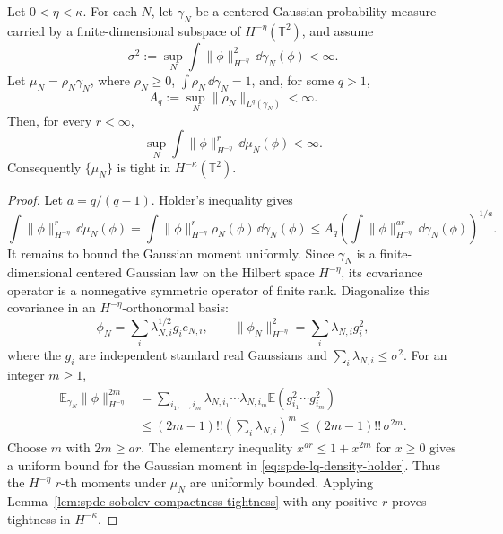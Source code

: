 \begin{lemma}
\label{lem:spde-lq-density-negative-sobolev-moment}
Let \(0<\eta<\kappa\).  For each \(N\), let \(\gamma_N\) be a centered
Gaussian probability measure carried by a finite-dimensional subspace of
\(H^{-\eta}(\mathbb T^2)\), and assume
\[
  \sigma^2:=
  \sup_N
  \int \|\phi\|_{H^{-\eta}}^2\,\dd\gamma_N(\phi)
  <\infty .
\]
Let \(\mu_N=\rho_N\gamma_N\), where
\(\rho_N\geq0\), \(\int\rho_N\,\dd\gamma_N=1\), and, for some \(q>1\),
\[
  A_q:=\sup_N\|\rho_N\|_{L^q(\gamma_N)}<\infty .
\]
Then, for every \(r<\infty\),
\[
  \sup_N
  \int\|\phi\|_{H^{-\eta}}^r\,\dd\mu_N(\phi)
  <\infty .
\]
Consequently \(\{\mu_N\}\) is tight in \(H^{-\kappa}(\mathbb T^2)\).
\end{lemma}

\begin{proof}
Let \(a=q/(q-1)\).  Holder's inequality gives
\begin{equation}
  \int\|\phi\|_{H^{-\eta}}^r\,\dd\mu_N(\phi)
  =
  \int\|\phi\|_{H^{-\eta}}^r\rho_N(\phi)\,\dd\gamma_N(\phi)
  \leq
  A_q
  \left(
    \int\|\phi\|_{H^{-\eta}}^{ar}\,\dd\gamma_N(\phi)
  \right)^{1/a}.
  \label{eq:spde-lq-density-holder}
\end{equation}
It remains to bound the Gaussian moment uniformly.  Since \(\gamma_N\) is a
finite-dimensional centered Gaussian law on the Hilbert space
\(H^{-\eta}\), its covariance operator is a nonnegative symmetric operator
of finite rank.  Diagonalize this covariance in an
\(H^{-\eta}\)-orthonormal basis:
\[
  \phi_N=\sum_i \lambda_{N,i}^{1/2}g_i e_{N,i},
  \qquad
  \|\phi_N\|_{H^{-\eta}}^2=\sum_i\lambda_{N,i}g_i^2,
\]
where the \(g_i\) are independent standard real Gaussians and
\(\sum_i\lambda_{N,i}\leq\sigma^2\).  For an integer \(m\geq1\),
\[
\begin{aligned}
  \mathbb E_{\gamma_N}\|\phi\|_{H^{-\eta}}^{2m}
  &=
  \sum_{i_1,\ldots,i_m}
  \lambda_{N,i_1}\cdots\lambda_{N,i_m}
  \mathbb E(g_{i_1}^2\cdots g_{i_m}^2)
\\
  &\leq
  (2m-1)!!
  \left(\sum_i\lambda_{N,i}\right)^m
  \leq
  (2m-1)!!\,\sigma^{2m}.
\end{aligned}
\]
Choose \(m\) with \(2m\geq ar\).  The elementary inequality
\(x^{ar}\leq1+x^{2m}\) for \(x\geq0\) gives a uniform bound for the
Gaussian moment in \eqref{eq:spde-lq-density-holder}.  Thus the
\(H^{-\eta}\) \(r\)-th moments under \(\mu_N\) are uniformly bounded.
Applying Lemma~\ref{lem:spde-sobolev-compactness-tightness} with any
positive \(r\) proves tightness in \(H^{-\kappa}\).
\end{proof}

